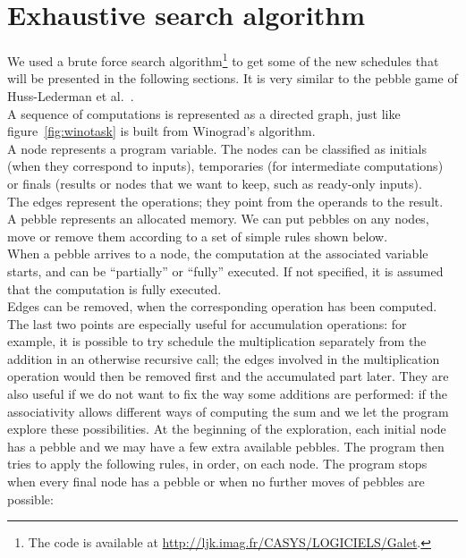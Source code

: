\documentclass{article}
\begin{document}
\section{Exhaustive search algorithm}\label{sec:pebble}
We used a brute force search algorithm\footnote{The code is available
  at \url{http://ljk.imag.fr/CASYS/LOGICIELS/Galet}.} to get some of the new
schedules that will be presented in the following sections.
It is very similar to the pebble game of
Huss-Lederman et al.\ \cite{Huss-Lederman:1996:mai}.\\A sequence of computations is represented as a directed graph, just like figure~\ref{fig:winotask} is built from Winograd's algorithm.\\
A node represents a program variable. The nodes can be classified as initials (when they correspond to inputs), temporaries
(for intermediate computations) or finals (results or nodes that we want to
keep, such as ready-only inputs).\\
The edges represent the operations; they point from the operands to the result.\\
A pebble represents an allocated memory. We can put pebbles on any
nodes, move or remove them according to a set of simple rules shown below.\\
When a pebble arrives to a node, the computation at the associated
variable starts, and can be ``partially'' or ``fully''
executed. If not specified, it is assumed that the computation is
fully executed.\\
Edges can be removed, when the corresponding operation has been
computed.\\
The last two points are especially useful for accumulation
operations: for example, it is possible to try schedule the multiplication
separately from the addition in an otherwise recursive  call;
the edges involved in the multiplication operation would then be removed first and the accumulated part later.
They are also useful if we do not want to fix the way some additions are
performed: if  the associativity allows
different ways of computing the sum and we let the program explore
these possibilities.
At the beginning of the exploration, each initial node has a pebble
and we may have a few extra available pebbles. 
The program then tries to apply the following rules, in order, on each
node. The program stops when every final node has a pebble or when
no further moves of pebbles are possible:
\end{document}
